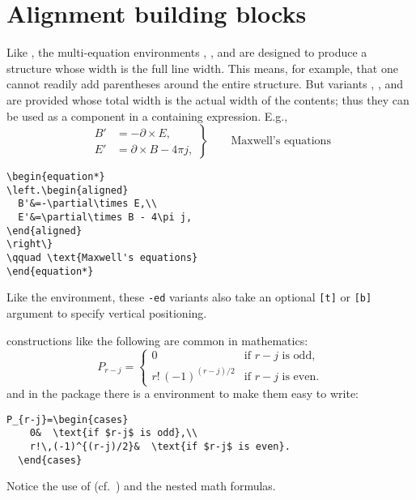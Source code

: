\documentclass[leqno,titlepage,openany]{amsldoc}[1999/12/13]
\begin{document}
\section{Alignment building blocks}

Like , the multi-equation environments ,
, and  are designed to produce a structure
whose width is the full line width. This means, for example, that one
cannot readily add parentheses around the entire structure. But variants
, , and  are provided whose
total width is the actual width of the contents; thus they can be used
as a component in a containing expression. E.g.,
\begin{equation*}
\left.\begin{aligned}
  B'&=-\partial\times E,\\
  E'&=\partial\times B - 4\pi j,
\end{aligned}
\right\}
\qquad \text{Maxwell's equations}
\end{equation*}
\begin{verbatim}
\begin{equation*}
\left.\begin{aligned}
  B'&=-\partial\times E,\\
  E'&=\partial\times B - 4\pi j,
\end{aligned}
\right\}
\qquad \text{Maxwell's equations}
\end{equation*}
\end{verbatim}
Like the  environment, these \texttt{-ed} variants also take
an optional \verb'[t]' or \verb'[b]' argument to specify vertical
positioning.

 constructions like the following are common in
mathematics:
\begin{equation}\label{eq:C}
P_{r-j}=
  \begin{cases}
    0&  \text{if $r-j$ is odd},\\
    r!\,(-1)^{(r-j)/2}&  \text{if $r-j$ is even}.
  \end{cases}
\end{equation}
and in the  package there is a  environment to
make them easy to write:
\begin{verbatim}
P_{r-j}=\begin{cases}
    0&  \text{if $r-j$ is odd},\\
    r!\,(-1)^{(r-j)/2}&  \text{if $r-j$ is even}.
  \end{cases}
\end{verbatim}
Notice the use of  (cf.~) and the nested
math formulas.
\end{document}
